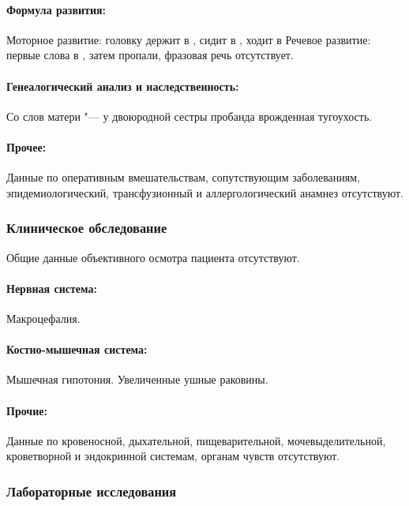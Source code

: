 \documentclass[a4paper,14pt]{extarticle}
\newcommand{\months}{мес.}
\begin{document}
\paragraph{Формула развития:} Моторное развитие: головку держит в \numprint[\months]{2}, сидит в \numprint[\months]{6}, ходит в \numprint[\months]{12}
Речевое развитие: первые слова в \numprint[\months]{12}, затем пропали, фразовая речь отсутствует. 

\paragraph{Генеалогический анализ и наследственность:} Со слов матери "--- у двоюродной сестры пробанда врожденная тугоухость.

\paragraph{Прочее:} Данные по оперативным вмешательствам, сопутствующим заболеваниям, эпидемиологический, трансфузионный и аллергологический анамнез отсутствуют.

\subsubsection*{Клиническое обследование}

Общие данные объективного осмотра пациента отсутствуют.

\paragraph{Нервная система:} Макроцефалия.

\paragraph{Костно-мышечная система:} Мышечная гипотония. Увеличенные ушные раковины.

\paragraph{Прочие:} Данные по кровеносной, дыхательной, пищеварительной, мочевыделительной, кроветворной и эндокринной системам, органам чувств отсутствуют.

\subsubsection*{Лабораторные исследования}
\end{document}

